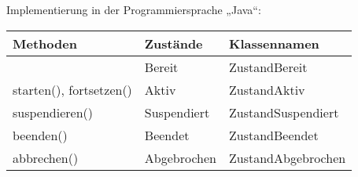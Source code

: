 \documentclass{lehramt-informatik-aufgabe}
\begin{document}
\begin{liAntwort}
Implementierung in der Programmiersprache „Java“:

\begin{center}
\begin{tabular}{l|l|l}
Methoden & Zustände & Klassennamen \\\hline\hline
& Bereit & ZustandBereit \\
starten(), fortsetzen() & Aktiv & ZustandAktiv \\
suspendieren() & Suspendiert & ZustandSuspendiert \\
beenden() & Beendet & ZustandBeendet \\
abbrechen() & Abgebrochen & ZustandAbgebrochen \\
\end{tabular}
\end{center}

\end{liAntwort}
\end{document}
